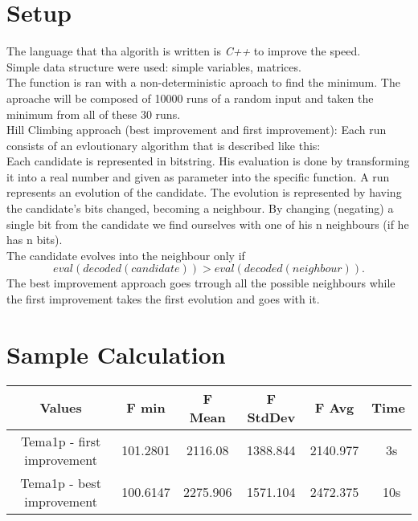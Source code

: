 \documentclass{article}
\begin{document}
\section{Setup}

The language that tha algorith is written is \emph{C++} to improve the speed.\\
Simple data structure were used: simple variables, matrices.\\

The function is ran with a non-deterministic aproach to find the minimum.
The aproache will be composed of 10000 runs of a random input and taken the minimum from all of these 30 runs.\\

Hill Climbing approach (best improvement and first improvement):
Each run consists of an evloutionary algorithm that is described like this: \\
Each candidate is represented in bitstring. His evaluation is done by transforming it into a real number and given as parameter into the specific function.
A run represents an evolution of the candidate. The evolution is represented by having the candidate's bits changed, becoming a neighbour. 
By changing (negating) a single bit from the candidate we find ourselves with one of his n neighbours (if he has n bits).\\
The candidate evolves into the neighbour only if
\begin{equation}
 eval(decoded(candidate)) > eval(decoded(neighbour)).
\end{equation}
The best improvement approach goes trrough all the possible neighbours while the first improvement takes the first evolution and goes with it.





\section{Sample Calculation}


\begin{center}
 \begin{tabular}{||c || c | c | c | c | c ||}
\hline
 Values 			&	 	 F min 			& 	 	F Mean		& 	 	 F StdDev		&		F Avg		 &    Time		\\
 \hline
 Tema1p - first improvement  &		101.2801		& 		 2116.08		& 		1388.844		 &		2140.977	&	~3s	\\
 \hline
 Tema1p - best improvement  &		100.6147		& 		 2275.906		& 		1571.104		 &	  	2472.375	&	~10s	\\
 \hline

\end{tabular}
\end{center}
\end{document}
